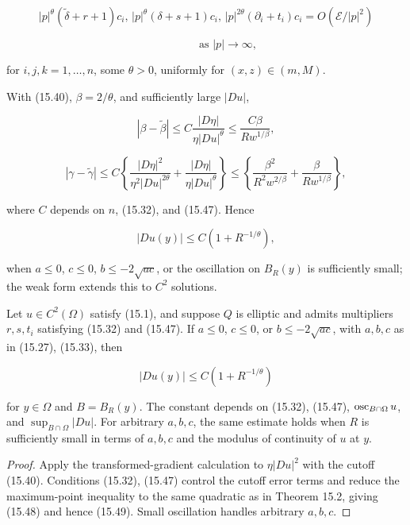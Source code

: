 \[
|p|^{\theta}(\tilde{\delta}+r+1)c_{i},\,|p|^{\theta}(\delta+s+1)c_{i},\,|p|^{2\theta}(\partial_{i}+t_{i})c_{i}=O(\mathscr{E}/|p|^{2})
\]

\[
\qquad\qquad\text{as } |p|\to\infty,
\]

for \(i,j,k=1,\ldots,n\), some \(\theta>0\), uniformly for \((x,z)\in(m,M)\).

With (15.40), \(\beta=2/\theta\), and sufficiently large \(|Du|\),

\[
|\beta-\tilde{\beta}|\leq C\frac{|D\eta|}{\eta|Du|^{\theta}}\leq \frac{C\beta}{Rw^{1/\beta}},
\]

\[
|\gamma-\tilde{\gamma}|\leq C\left\{\frac{|D\eta|^{2}}{\eta^{2}|Du|^{2\theta}}+\frac{|D\eta|}{\eta|Du|^{\theta}}\right\}\leq
\left\{\frac{\beta^{2}}{R^{2}w^{2/\beta}}+\frac{\beta}{Rw^{1/\beta}}\right\},
\]

where \(C\) depends on \(n\), (15.32), and (15.47). Hence

\begin{equation}
\tag{15.48}
|Du(y)|\leq C\left(1+R^{-1/\theta}\right),
\end{equation}


when \(a\le0\), \(c\le0\), \(b\le-2\sqrt{ac}\), or the oscillation on
\(B_R(y)\) is sufficiently small; the weak form extends this to \(C^2\) solutions.

\begin{theorem}\label{gilbarg-trudinger.thm.15.3.local-gradient-structure}
Let $u\in C^2(\Omega)$ satisfy (15.1), and suppose $Q$ is elliptic and admits multipliers
$r,s,t_i$ satisfying (15.32) and (15.47). If $a\leq0$, $c\leq0$, or
$b\leq-2\sqrt{ac}$, with $a,b,c$ as in (15.27), (15.33), then

\begin{equation}
\tag{15.49}
|Du(y)| \leq C(1 + R^{-1/\theta})
\end{equation}

for $y\in\Omega$ and $B=B_R(y)$. The constant depends on (15.32), (15.47),
$\operatorname{osc}_{B\cap\Omega}u$, and $\sup_{B\cap\Omega}|Du|$. For arbitrary $a,b,c$, the same
estimate holds when $R$ is sufficiently small in terms of $a,b,c$ and the modulus of
continuity of $u$ at $y$.
\end{theorem}
\begin{proof}
\sketch Apply the transformed-gradient calculation to $\eta|Du|^2$ with the cutoff
(15.40). Conditions (15.32), (15.47) control the cutoff error terms and reduce the
maximum-point inequality to the same quadratic as in Theorem 15.2, giving (15.48)
and hence (15.49). Small oscillation handles arbitrary $a,b,c$.
\end{proof}

